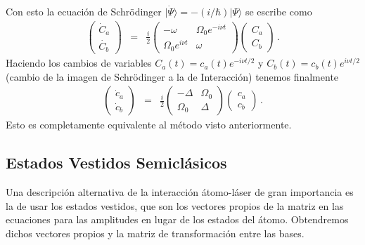 \documentclass[twocolumn,aps,eqsecnum]{revtex4}
\providecommand{\ket}[1]{\lvert #1 \rangle}
\begin{document}
Con esto la ecuaci\'on de Schr\"odinger 
$\ket{\dot{\Psi}} = -(i/\hbar) \ket{\Psi}$ se escribe como 
%
\begin{eqnarray*}
\left( \begin{array}{c} \dot{C}_a \\ \dot{C_b} \end{array}  \right)
	&=& \frac{i}{2} 
\left( \begin{array}{cc}  - \omega & \Omega_0 e^{-i \nu t} \\ 
	 \Omega_0 e^{i \nu t} & \omega  \end{array} \right) 
	 \left( \begin{array}{c} C_a \\ C_b \end{array}  \right) \,.
\end{eqnarray*}
Haciendo los cambios de variables $C_a(t) = c_a(t) e^{-i \nu t/2}$ y 
$C_b(t) = c_b(t) e^{i \nu t/2}$ (cambio de la imagen de Schr\"odinger a la de 
Interacci\'on) tenemos finalmente 
%
\begin{eqnarray}
\left( \begin{array}{c} \dot{c}_a \\ \dot{c}_b \end{array}  \right)
	&=& \frac{i}{2} 
\left( \begin{array}{cc}  - \Delta & \Omega_0  \\ 
	 \Omega_0  & \Delta  \end{array} \right) 
	 \left( \begin{array}{c} c_a \\ c_b \end{array}  \right) \,.
\end{eqnarray}
Esto es completamente equivalente al m\'etodo visto anteriormente. 

\subsection{Estados Vestidos Semicl\'asicos \label{dressedST}}  
Una descripci\'on alternativa de la interacci\'on \'atomo-l\'aser de gran 
importancia es la de usar los estados vestidos, que son los vectores propios 
de la matriz en las ecuaciones para las amplitudes en lugar de los 
estados del \'atomo. Obtendremos dichos vectores propios y la matriz de transformaci\'on entre las bases. 
\end{document}
